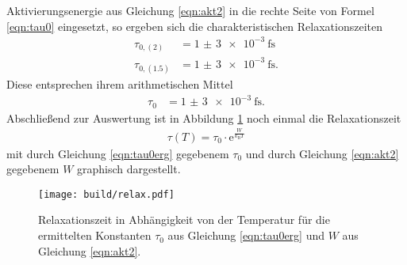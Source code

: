 Aktivierungsenergie aus Gleichung \eqref{eqn:akt2} in die rechte Seite von Formel \eqref{eqn:tau0}
eingesetzt, so ergeben sich die charakteristischen Relaxationszeiten
\begin{align}
  \tau_{0,(2)} &= \SI{1(3)e-3}{\femto\second} \\
  \tau_{0,(1.5)} &= \SI{1(3)e-3}{\femto\second}.
\end{align}
Diese entsprechen ihrem arithmetischen Mittel
\begin{align}
  \tau_0 &= \SI{1(3)e-3}{\femto\second}.
  \label{eqn:tau0erg}
\end{align}
Abschließend zur Auswertung ist in Abbildung \ref{fig:relaxationszeit} noch einmal die Relaxationszeit
\begin{align}
  \tau(T) = \tau_0 \cdot \mathrm{e}^{\frac{W}{k_\text{B} T}}
\end{align}
mit durch Gleichung \eqref{eqn:tau0erg} gegebenem $\tau_0$ und durch Gleichung \eqref{eqn:akt2} gegebenem
$W$ graphisch dargestellt.

\begin{figure}
  \centering
  \texttt{[image: build/relax.pdf]}
  \caption{Relaxationszeit in Abhängigkeit von der Temperatur für die ermittelten Konstanten $\tau_0$ aus
  Gleichung \eqref{eqn:tau0erg} und $W$ aus Gleichung \eqref{eqn:akt2}.}
  \label{fig:relaxationszeit}
\end{figure}
